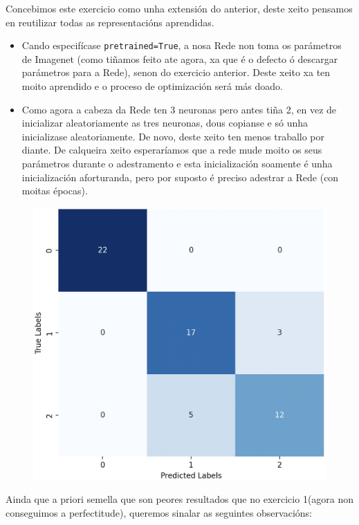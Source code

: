 \documentclass{article}
\begin{document}
Concebimos este exercicio como unha extensión do anterior, deste xeito pensamos en reutilizar todas as representacións aprendidas.
\begin{itemize}
	\item Cando especifícase \texttt{pretrained=True}, a nosa Rede non toma os parámetros de Imagenet (como tiñamos feito ate agora, xa que é o defecto ó descargar parámetros para a Rede), senon do exercicio anterior. Deste xeito xa ten moito aprendido e o proceso de optimización será más doado.
	\item Como agora a cabeza da Rede ten 3 neuronas pero antes tiña 2, en vez de inicializar aleatoriamente as tres neuronas, dous copianse e só unha inicializase aleatoriamente. De novo, deste xeito ten menos traballo por diante. De calqueira xeito esperaríamos que a rede mude moito os seus parámetros durante o adestramento e esta inicialización soamente é unha inicialización aforturanda, pero por suposto é preciso adestrar a Rede (con moitas épocas).

\end{itemize}


\begin{figure}
	\includegraphics[width=1\linewidth]{cmEj2} 
	\label{fig:cmEj2}
\end{figure}

Ainda que a priori semella que son peores resultados que no exercicio 1(agora non conseguimos a perfectitude), queremos sinalar as seguintes observacións:
\end{document}
